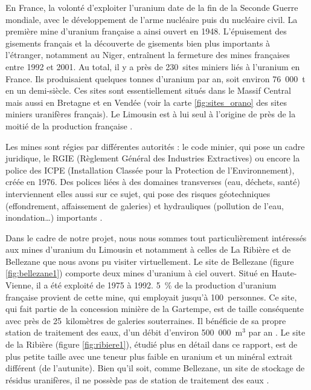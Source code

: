 \documentclass{article}
\begin{document}

En France, la volonté d’exploiter l’uranium date de la fin de la Seconde Guerre mondiale, avec le développement de l'arme nucléaire puis du nucléaire civil. La première mine d’uranium française a ainsi ouvert en 1948. L’épuisement des gisements français et la découverte de gisements bien plus importants à l’étranger, notamment au Niger, entraînent la fermeture des mines françaises entre 1992 et 2001. Au total, il y a près de 230~sites miniers liés à l’uranium en France. Ils produisaient quelques tonnes d'uranium par an, soit environ 76~000~t en un demi-siècle. Ces sites sont essentiellement situés dans le Massif Central mais aussi en Bretagne et en Vendée (voir la carte \ref{fig:sites_orano} des sites miniers uranifères français). Le Limousin est à lui seul à l’origine de près de la moitié de la production française \cite{descostes_introduction_2020}.

Les mines sont régies par différentes autorités : le code minier, qui pose un cadre juridique, le RGIE (Règlement Général des Industries Extractives) ou encore la police des ICPE (Installation Classée pour la Protection de l’Environnement), créée en 1976. Des polices liées à des domaines transverses (eau, déchets, santé) interviennent elles aussi sur ce sujet, qui pose des risques géotechniques (effondrement, affaissement de galeries) et hydrauliques (pollution de l'eau, inondation…) importants \cite{ledoux_notions_2020}\cite{dublineau_gestion_2020}\cite{raimbault_mine_2020}.

Dans le cadre de notre projet, nous nous sommes tout particulièrement intéressés aux mines d'uranium du Limousin et notamment à celles de La Ribière et de Bellezane que nous avons pu visiter virtuellement. Le site de Bellezane (figure \ref{fig:bellezane1}) comporte deux mines d'uranium à ciel ouvert. Situé en Haute-Vienne, il a été exploité de 1975 à 1992. 5~\% de la production d’uranium française provient de cette mine, qui employait jusqu’à 100~personnes. Ce site, qui fait partie de la concession minière de la Gartempe, est de taille conséquente avec près de 25~kilomètres de galeries souterraines. Il bénéficie de sa propre station de traitement des eaux, d'un débit d'environ 500~000~$\text{m}^3$ par an \cite{benesteau_site_2020}. Le site de la Ribière (figure \ref{fig:ribiere1}), étudié plus en détail dans ce rapport, est de plus petite taille avec une teneur plus faible en uranium et un minéral extrait différent (de l’autunite). Bien qu'il soit, comme Bellezane, un site de stockage de résidus uranifères, il ne possède pas de station de traitement des eaux \cite{descostes_introduction_2020}.
\end{document}

